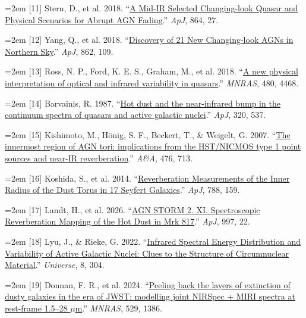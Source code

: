 \documentclass[12pt]{article}
\begin{document}
\noindent\hangindent=2em [11] Stern, D., et al. 2018. ``\href{https://doi.org/10.3847/1538-4357/aac726}{A Mid-IR Selected Changing-look Quasar and Physical Scenarios for Abrupt AGN Fading}.'' \emph{ApJ}, 864, 27.\par
\noindent\hangindent=2em [12] Yang, Q., et al. 2018. ``\href{https://doi.org/10.3847/1538-4357/aaca3a}{Discovery of 21 New Changing-look AGNs in Northern Sky}.'' \emph{ApJ}, 862, 109.\par
\noindent\hangindent=2em [13] Ross, N. P., Ford, K. E. S., Graham, M., et al. 2018. ``\href{https://doi.org/10.1093/mnras/sty2002}{A new physical interpretation of optical and infrared variability in quasars}.'' \emph{MNRAS}, 480, 4468.\par
\noindent\hangindent=2em [14] Barvainis, R. 1987. ``\href{https://doi.org/10.1086/165571}{Hot dust and the near-infrared bump in the continuum spectra of quasars and active galactic nuclei}.'' \emph{ApJ}, 320, 537.\par
\noindent\hangindent=2em [15] Kishimoto, M., H\"onig, S. F., Beckert, T., \& Weigelt, G. 2007. ``\href{https://doi.org/10.1051/0004-6361:20077911}{The innermost region of AGN tori: implications from the HST/NICMOS type 1 point sources and near-IR reverberation}.'' \emph{A\&A}, 476, 713.\par
\noindent\hangindent=2em [16] Koshida, S., et al. 2014. ``\href{https://doi.org/10.1088/0004-637X/788/2/159}{Reverberation Measurements of the Inner Radius of the Dust Torus in 17 Seyfert Galaxies}.'' \emph{ApJ}, 788, 159.\par
\noindent\hangindent=2em [17] Landt, H., et al. 2026. ``\href{https://doi.org/10.3847/1538-4357/ae17cd}{AGN STORM 2. XI. Spectroscopic Reverberation Mapping of the Hot Dust in Mrk 817}.'' \emph{ApJ}, 997, 22.\par
\noindent\hangindent=2em [18] Lyu, J., \& Rieke, G. 2022. ``\href{https://doi.org/10.3390/universe8060304}{Infrared Spectral Energy Distribution and Variability of Active Galactic Nuclei: Clues to the Structure of Circumnuclear Material}.'' \emph{Universe}, 8, 304.\par
\noindent\hangindent=2em [19] Donnan, F. R., et al. 2024. ``\href{https://doi.org/10.1093/mnras/stae612}{Peeling back the layers of extinction of dusty galaxies in the era of JWST: modelling joint NIRSpec + MIRI spectra at rest-frame 1.5--28 $\mu$m}.'' \emph{MNRAS}, 529, 1386.\par
\end{document}
